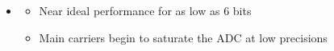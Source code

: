 \documentclass[25pt]{tikzposter} %
\begin{document}
\begin{columns}
{\begin{tikzfigure}[]
		\end{tikzfigure}
		\begin{itemize}
			\item[] {} %
			\begin{itemize}
				\item {Near ideal performance for as low as 6 bits}
				\item {Main carriers begin to saturate the ADC at low precisions} 
			\end{itemize}
		\end{itemize}	
	}







\end{columns}
\end{document}
